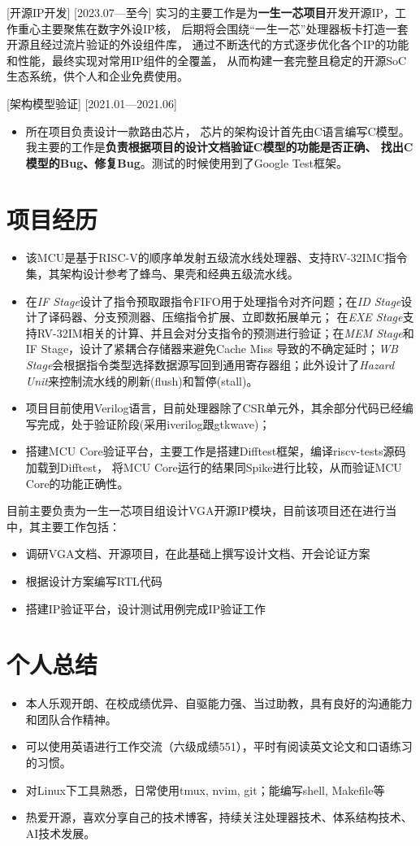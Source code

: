 \documentclass{resume}
\begin{document}
[\textnormal{开源IP开发}]
[2023.07—至今] 
实习的主要工作是为\textbf{一生一芯项目}开发开源IP，工作重心主要聚焦在数字外设IP核，
后期将会围绕“一生一芯”处理器板卡打造一套开源且经过流片验证的外设组件库，
通过不断迭代的方式逐步优化各个IP的功能和性能，最终实现对常用IP组件的全覆盖，
从而构建一套完整且稳定的开源SoC生态系统，供个人和企业免费使用。

[架构模型验证]
[2021.01—2021.06] 
\begin{itemize}
  \item 所在项目负责设计一款路由芯片，
      芯片的架构设计首先由C语言编写C模型。
      我主要的工作是\textbf{负责根据项目的设计文档验证C模型的功能是否正确、
      找出C模型的Bug、修复Bug}。测试的时候使用到了Google Test框架。
\end{itemize}

\section{项目经历}
\begin{itemize}
    \item 该MCU是基于RISC-V的顺序单发射五级流水线处理器、支持RV-32IMC指令集，其架构设计参考了蜂鸟、果壳和经典五级流水线。
    \item 在\textit{IF Stage}设计了指令预取跟指令FIFO用于处理指令对齐问题；在\textit{ID Stage}设计了译码器、分支预测器、压缩指令扩展、立即数拓展单元；
        在\textit{EXE Stage}支持RV-32IM相关的计算、并且会对分支指令的预测进行验证；在\textit{MEM Stage}和IF Stage，设计了紧耦合存储器来避免Cache Miss
        导致的不确定延时；\textit{WB Stage}会根据指令类型选择数据源写回到通用寄存器组；此外设计了\textit{Hazard Unit}来控制流水线的刷新(flush)和暂停(stall)。
    \item 项目目前使用Verilog语言，目前处理器除了CSR单元外，其余部分代码已经编写完成，处于验证阶段(采用iverilog跟gtkwave)；
    \item 搭建MCU Core验证平台，主要工作是搭建Difftest框架，编译riscv-tests源码加载到Difftest，
        将MCU Core运行的结果同Spike进行比较，从而验证MCU Core的功能正确性。
\end{itemize}
目前主要负责为一生一芯项目组设计VGA开源IP模块，目前该项目还在进行当中，其主要工作包括：

\begin{itemize}
    \item 调研VGA文档、开源项目，在此基础上撰写设计文档、开会论证方案
    \item 根据设计方案编写RTL代码
    \item 搭建IP验证平台，设计测试用例完成IP验证工作
\end{itemize}

\section{个人总结}
\begin{itemize}
    \item 本人乐观开朗、在校成绩优异、自驱能力强、当过助教，具有良好的沟通能力和团队合作精神。
    \item 可以使用英语进行工作交流（六级成绩551），平时有阅读英文论文和口语练习的习惯。
    \item 对Linux下工具熟悉，日常使用tmux, nvim, git；能编写shell, Makefile等
    \item 热爱开源，喜欢分享自己的技术博客，持续关注处理器技术、体系结构技术、AI技术发展。
\end{itemize}
\end{document}
